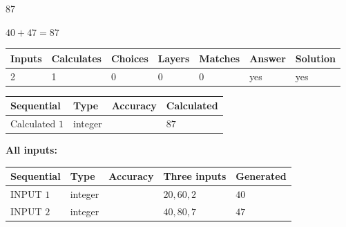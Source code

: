 \documentclass[12pt]{article}
\begin{document}
 
 
\noindent{}
 
 

87
 
 
\noindent{}
 
 

 
 
 
\noindent{}
 
 

$ %
40 +  %
47=   %
87$
 
 
\noindent{}
 
 

 
   
   
   
   
\noindent\begin{tabular}{|l|l|l|l|l|l|l|}
 \hline
Inputs & Calculates & Choices & Layers & Matches & Answer & Solution \\ \hline
 2  & 
 1  & 
 0
  & 
 0  & 
 0  & 
  yes & 
  yes 
  \\ \hline
 \end{tabular}
   
   
   
   
\noindent{}
   
   
  
  
\noindent\begin{tabular}{|l|l|l|l|}
\hline
 Sequential & Type & Accuracy & Calculated \\ 
\hline
 
 
  Calculated $  1 $ & integer &  & 
  $ 87 $ 
 \\  \hline  
 \end{tabular}
   
   
   
   
\noindent\vspace{0.1in}\hspace{-0.08in} {\textbf{\Large{All inputs: }}}
   
   
  
  
\noindent\begin{tabular}{|l|l|l|l|l|}
\hline
 Sequential & Type & Accuracy & Three inputs & Generated \\ 
\hline
 
 
  INPUT $  1 $ & integer &  & $
 20
 , 
 60
 , 
 2
 $ & $ 40 $ 
 \\  \hline  
 
 
  INPUT $  2 $ & integer &  & $
 40
 , 
 80
 , 
 7
 $ & $ 47 $ 
 \\  \hline  
 \end{tabular}
   
\end{document}
